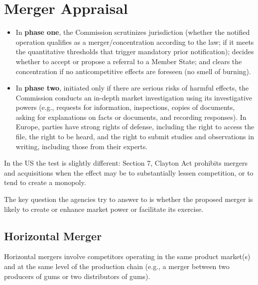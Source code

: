 \newpage
\section{Merger Appraisal}

    \begin{itemize}
        \item In \textbf{phase one}, the Commission scrutinizes jurisdiction (whether the notified operation qualifies as a merger/concentration according to the law; if it meets the quantitative thresholds that trigger mandatory prior notification); decides whether to accept or propose a referral to a Member State; and clears the concentration if no anticompetitive effects are foreseen (no smell of burning).
    
        \item In \textbf{phase two}, initiated only if there are serious risks of harmful effects, the Commission conducts an in-depth market investigation using its investigative powers (e.g., requests for information, inspections, copies of documents, asking for explanations on facts or documents, and recording responses). In Europe, parties have strong rights of defense, including the right to access the file, the right to be heard, and the right to submit studies and observations in writing, including those from their experts.
    \end{itemize}


    In the US the test is slightly different: Section 7, Clayton Act prohibits mergers and acquisitions when the effect may be to substantially lessen competition, or to tend to create a monopoly. 
    
    The key question the agencies try to answer to is whether the proposed merger is likely to create or enhance market power or facilitate its exercise.

    \subsection{Horizontal Merger}

        Horizontal mergers involve competitors operating in the same product market(s) and at the same level of the production chain (e.g., a merger between two producers of gums or two distributors of gums).
    
